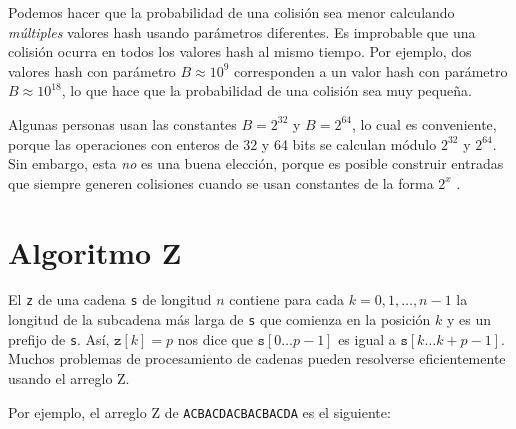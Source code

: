 Podemos hacer que la probabilidad de una colisión
sea menor calculando \emph{múltiples} valores hash
usando parámetros diferentes.
Es improbable que una colisión ocurra
en todos los valores hash al mismo tiempo.
Por ejemplo, dos valores hash con parámetro
$B \approx 10^9$ corresponden a un valor hash
con parámetro $B \approx 10^{18}$,
lo que hace que la probabilidad de una colisión sea muy pequeña.

Algunas personas usan las constantes $B=2^{32}$ y $B=2^{64}$,
lo cual es conveniente, porque las operaciones con enteros de 32 y 64
bits se calculan módulo $2^{32}$ y $2^{64}$.
Sin embargo, esta \emph{no} es una buena elección, porque es posible
construir entradas que siempre generen colisiones cuando
se usan constantes de la forma $2^x$ \cite{pac13}.

\section{Algoritmo Z}


El  \texttt{z} de una cadena \texttt{s}
de longitud $n$ contiene para cada $k=0,1,\ldots,n-1$
la longitud de la subcadena más larga de \texttt{s}
que comienza en la posición $k$ y es un prefijo de \texttt{s}.
Así, $\texttt{z}[k]=p$ nos dice que
$\texttt{s}[0 \ldots p-1]$ es igual a $\texttt{s}[k \ldots k+p-1]$.
Muchos problemas de procesamiento de cadenas pueden resolverse eficientemente
usando el arreglo Z.

Por ejemplo, el arreglo Z de
\texttt{ACBACDACBACBACDA} es el siguiente:

